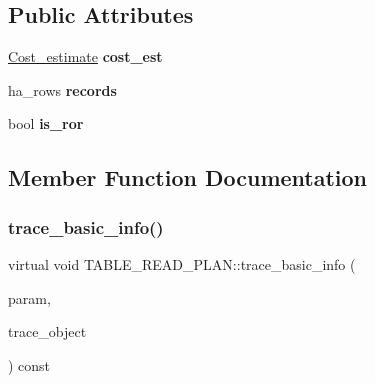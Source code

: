 \subsection*{Public Attributes}
\begin{DoxyCompactItemize}
\item 
\mbox{\label{classTABLE__READ__PLAN_a25d20e84d2d5f8e55ba329e41129fb85}} 
\mbox{\hyperlink{classCost__estimate}{Cost\+\_\+estimate}} {\bfseries cost\+\_\+est}
\item 
\mbox{\label{classTABLE__READ__PLAN_ada61f2d344704d7b719a1779ccd18603}} 
ha\+\_\+rows {\bfseries records}
\item 
\mbox{\label{classTABLE__READ__PLAN_a866a8196dd622ae5f7419d48bae797ff}} 
bool {\bfseries is\+\_\+ror}
\end{DoxyCompactItemize}


\subsection{Member Function Documentation}
\mbox{\label{classTABLE__READ__PLAN_a35e1758c9edce0c8bea19a602409f861}} 
\subsubsection{\texorpdfstring{trace\+\_\+basic\+\_\+info()}{trace\_basic\_info()}}
{\footnotesize\ttfamily virtual void T\+A\+B\+L\+E\+\_\+\+R\+E\+A\+D\+\_\+\+P\+L\+A\+N\+::trace\+\_\+basic\+\_\+info (\begin{DoxyParamCaption}\item[{const \mbox{\hyperlink{classPARAM}{P\+A\+R\+AM}} $\ast$}]{param,  }\item[{\mbox{\hyperlink{classOpt__trace__object}{Opt\+\_\+trace\+\_\+object}} $\ast$}]{trace\+\_\+object }\end{DoxyParamCaption}) const\hspace{0.3cm}{\ttfamily [pure virtual]}}


